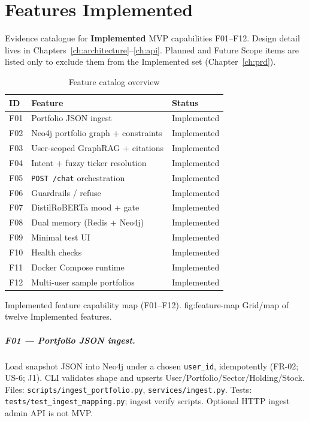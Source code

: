 \chapter{Features Implemented}
\label{ch:features}

Evidence catalogue for \textbf{Implemented} MVP capabilities F01--F12. Design detail lives in Chapters~\ref{ch:architecture}--\ref{ch:api}. Planned and Future Scope items are listed only to exclude them from the Implemented set (Chapter~\ref{ch:prd}).

\begin{table}[!htbp]
\centering
\small
\caption{Feature catalog overview}
\label{tab:feature-catalog}
\begin{tabularx}{\textwidth}{@{}
  >{\centering\arraybackslash}p{}
  >{\raggedright\arraybackslash}X
  >{\centering\arraybackslash}p{}
  @{}}
\toprule
\textbf{ID} & \textbf{Feature} & \textbf{Status} \\
\midrule
F01 & Portfolio JSON ingest & Implemented \\
F02 & Neo4j portfolio graph + constraints & Implemented \\
F03 & User-scoped GraphRAG + citations & Implemented \\
F04 & Intent + fuzzy ticker resolution & Implemented \\
F05 & \texttt{POST /chat} orchestration & Implemented \\
F06 & Guardrails / refuse & Implemented \\
F07 & DistilRoBERTa mood + gate & Implemented \\
F08 & Dual memory (Redis + Neo4j) & Implemented \\
F09 & Minimal test UI & Implemented \\
F10 & Health checks & Implemented \\
F11 & Docker Compose runtime & Implemented \\
F12 & Multi-user sample portfolios & Implemented \\
\bottomrule
\end{tabularx}
\end{table}

%
{Implemented feature capability map (F01--F12).}%
{fig:feature-map}%
{Grid/map of twelve Implemented features.}

\paragraph{F01 --- Portfolio JSON ingest.}
Load snapshot JSON into Neo4j under a chosen \texttt{user\_id}, idempotently (FR-02; US-6; J1). CLI validates shape and upserts User/Portfolio/Sector/Holding/Stock. Files: \texttt{scripts/ingest\_portfolio.py}, \texttt{services/ingest.py}. Tests: \texttt{tests/test\_ingest\_mapping.py}; ingest verify scripts. Optional HTTP ingest admin API is not MVP.

